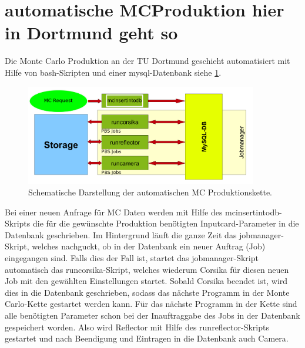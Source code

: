 



\section{automatische MCProduktion hier in Dortmund geht so}

Die Monte Carlo Produktion an der TU Dortmund geschieht automatisiert mit Hilfe von bash-Skripten und einer mysql-Datenbank siehe \ref{Jobmanager}.

\begin{figure}
    \centering
    \includegraphics[width=0.9\textwidth]{./Plots/Jobmanager.png}
    \caption{Schematische Darstellung der automatischen MC Produktionskette.}
    \label{Jobmanager}
\end{figure}


Bei einer neuen Anfrage für MC Daten werden mit Hilfe des mcinsertintodb-Skripts die für die gewünschte Produktion benötigten Inputcard-Parameter in die Datenbank geschrieben.
Im Hintergrund läuft die ganze Zeit das jobmanager-Skript, welches nachguckt, ob in der Datenbank ein neuer Auftrag (Job) eingegangen sind.
Falls dies der Fall ist, startet das jobmanager-Skript automatisch das runcorsika-Skript, welches wiederum Corsika für diesen neuen Job mit den gewählten Einstellungen startet.
Sobald Corsika beendet ist, wird dies in die Datenbank geschrieben, sodass das nächste Programm in der Monte Carlo-Kette gestartet werden kann.
Für das nächste Programm in der Kette sind alle benötigten Parameter schon bei der Inauftraggabe des Jobs in der Datenbank gespeichert worden.
Also wird Reflector mit Hilfe des runreflector-Skripts gestartet und nach Beendigung und Eintragen in die Datenbank auch Camera.

